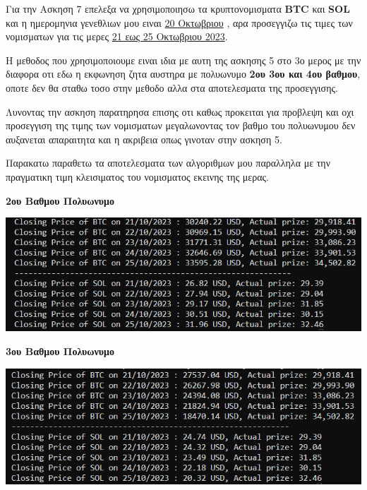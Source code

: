 \documentclass[a4paper,11pt]{article}
\begin{document}
	\begin{center}
		Για την Ασκηση 7 επελεξα να χρησιμοποιησω τα κρυπτονομισματα \textbf{BTC} και \textbf{SOL} και η ημερομηνια γενεθλιων μου ειναι \underline{20 Οκτωβριου} , αρα προσεγγιζω τις τιμες των νομισματων για τις μερες \underline{21 εως 25 Οκτωβριου 2023}.
	\end{center}
	\begin{center}
		Η μεθοδος που χρησιμοποιουμε ειναι ιδια με αυτη της ασκησης 5 στο 3ο μερος με την διαφορα οτι εδω η εκφωνηση ζητα αυστηρα με πολυωνυμο \textbf{2ου 3ου και 4ου βαθμου}, οποτε δεν θα σταθω τοσο στην μεθοδο αλλα στα αποτελεσματα της προσεγγισης. 
	\end{center}
	\begin{center}
		Λυνοντας την ασκηση παρατηρησα επισης οτι καθως προκειται για προβλεψη και οχι προσεγγιση της τιμης των νομισματων μεγαλωνοντας τον βαθμο του πολυωνυμου δεν αυξανεται απαραιτητα και η ακριβεια οπως γινοταν στην ασκηση 5.
	\end{center}
	\begin{center}
		Παρακατω παραθετω τα αποτελεσματα των αλγοριθμων μου παραλληλα με την πραγματικη τιμη κλεισιματος του νομισματος εκεινης της μερας. 
	\end{center}
	\begin{center}
	\textbf{	2ου Βαθμου Πολυωνυμο }
	\end{center}
	\begin{center}
		\emph{\includegraphics[scale=0.75]{ex7_2.png}}
	\end{center}
	\begin{center}
		\textbf{	3ου Βαθμου Πολυωνυμο }
	\end{center}
	\begin{center}
		\emph{\includegraphics[scale=0.75]{ex7_3.png}}
	\end{center}
\end{document}
